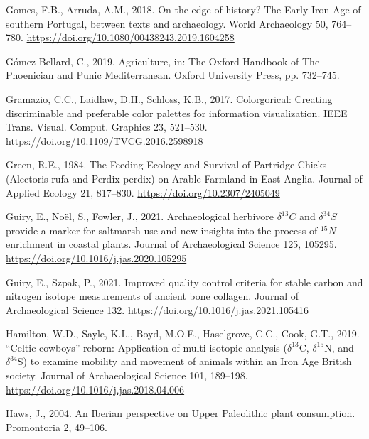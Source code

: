 \documentclass[preprint, 3p, authoryear]{elsarticle} %
\newlength{\cslhangindent}
\newlength{\cslentryspacingunit} %
\newenvironment{CSLReferences}[2] %
 {%
  \setlength{\parindent}{0pt}
  \ifodd #1
  \let\oldpar\par
  \def\par{\hangindent=\cslhangindent\oldpar}
  \fi
  \setlength{\parskip}{#2\cslentryspacingunit}
 }%
 {}
\begin{document}
\begin{CSLReferences}{1}{0}
\leavevmode{}%
Gomes, F.B., Arruda, A.M., 2018. On the edge of history? {The Early Iron Age} of southern {Portugal}, between texts and archaeology. World Archaeology 50, 764--780. \url{https://doi.org/10.1080/00438243.2019.1604258}

\leavevmode{}%
Gómez Bellard, C., 2019. Agriculture, in: The {Oxford Handbook} of {The Phoenician} and {Punic Mediterranean}. {Oxford University Press}, pp. 732--745.

\leavevmode{}%
Gramazio, C.C., Laidlaw, D.H., Schloss, K.B., 2017. Colorgorical: {Creating} discriminable and preferable color palettes for information visualization. IEEE Trans. Visual. Comput. Graphics 23, 521--530. \url{https://doi.org/10.1109/TVCG.2016.2598918}

\leavevmode{}%
Green, R.E., 1984. The {Feeding Ecology} and {Survival} of {Partridge Chicks} ({Alectoris} rufa and {Perdix} perdix) on {Arable Farmland} in {East Anglia}. Journal of Applied Ecology 21, 817--830. \url{https://doi.org/10.2307/2405049}

\leavevmode{}%
Guiry, E., Noël, S., Fowler, J., 2021. Archaeological herbivore {\(\delta ^{13}C\)} and {\(\delta ^{34}S\)} provide a marker for saltmarsh use and new insights into the process of {\(^{15}N\)-enrichment} in coastal plants. Journal of Archaeological Science 125, 105295. \url{https://doi.org/10.1016/j.jas.2020.105295}

\leavevmode{}%
Guiry, E., Szpak, P., 2021. Improved quality control criteria for stable carbon and nitrogen isotope measurements of ancient bone collagen. Journal of Archaeological Science 132. \url{https://doi.org/10.1016/j.jas.2021.105416}

\leavevmode{}%
Hamilton, W.D., Sayle, K.L., Boyd, M.O.E., Haselgrove, C.C., Cook, G.T., 2019. {``{Celtic} cowboys''} reborn: Application of multi-isotopic analysis ({\(\delta^{13}\)C}, {\(\delta^{15}\)N}, and {\(\delta^{34}\)S}) to examine mobility and movement of animals within an {Iron Age British} society. Journal of Archaeological Science 101, 189--198. \url{https://doi.org/10.1016/j.jas.2018.04.006}

\leavevmode{}%
Haws, J., 2004. An {Iberian} perspective on {Upper Paleolithic} plant consumption. Promontoria 2, 49--106.


\end{CSLReferences}
\end{document}
